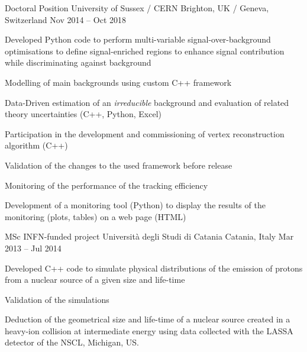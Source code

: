   \begin{cventries}    
    \cventry
    {Doctoral Position}
    {University of Sussex / CERN}
    {Brighton, UK / Geneva, Switzerland}
    {Nov 2014 -- Oct 2018}
    {
    \begin{cvitems}
      \item Developed Python code to perform multi-variable signal-over-background optimisations to define signal-enriched regions to enhance signal contribution while discriminating against background
      \item Modelling of main backgrounds using custom C++ framework
      \item Data-Driven estimation of an \emph{irreducible} background and evaluation of related theory uncertainties (C++, Python, Excel)
      \item Participation in the development and commissioning of vertex reconstruction algorithm (C++)
      \item Validation of the changes to the used framework before release
      \item Monitoring of the performance of the tracking efficiency
      \item Development of a monitoring tool (Python) to display the results of the monitoring (plots, tables) on a web page (HTML)
    \end{cvitems}
    }
  \end{cventries}

  \begin{cventries}    
    \cventry
    {MSc INFN-funded project}
    {Università degli Studi di Catania}
    {Catania, Italy}
    {Mar 2013 -- Jul 2014}
    {
    \begin{cvitems}
      \item Developed C++ code to simulate physical distributions of the emission of protons from a nuclear source of a given size and life-time
      \item Validation of the simulations
      \item Deduction of the geometrical size and life-time of a nuclear source created in a heavy-ion collision at intermediate energy using data collected with the LASSA detector of the NSCL, Michigan, US.
    \end{cvitems}
    }
  \end{cventries}
